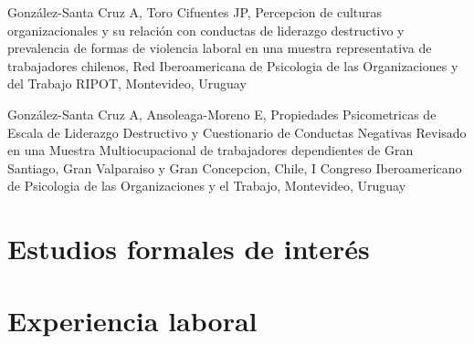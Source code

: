 \documentclass[11pt,a4paper,]{awesome-cv}
\begin{document}
\begin{cventries}
{\begin{cvitems}
\item González-Santa Cruz A, Toro Cifuentes JP, Percepcion de culturas organizacionales y su relación con conductas de liderazgo destructivo y prevalencia de formas de violencia laboral en una muestra representativa de trabajadores chilenos, Red Iberoamericana de Psicologia de las Organizaciones y del Trabajo RIPOT, Montevideo, Uruguay
\item González-Santa Cruz A, Ansoleaga-Moreno E, Propiedades Psicometricas de Escala de Liderazgo Destructivo y Cuestionario de Conductas Negativas Revisado en una Muestra Multiocupacional de trabajadores dependientes de Gran Santiago, Gran Valparaiso y Gran Concepcion, Chile, I Congreso Iberoamericano de Psicologia de las Organizaciones y el Trabajo, Montevideo, Uruguay
\end{cvitems}}
\end{cventries}

\hypertarget{estudios-formales-de-interuxe9s}{%
\section{Estudios formales de
interés}\label{estudios-formales-de-interuxe9s}}

\fontsize{9.5pt}{1.2em}\color{text}
\begin{cventries}
    \vspace{-4.0mm}
    \vspace{-4.0mm}
    \vspace{-4.0mm}
    \vspace{-4.0mm}
    \vspace{-4.0mm}
\end{cventries}

\pagebreak

\linebreak

\hypertarget{experiencia-laboral-1}{%
\section{Experiencia laboral}\label{experiencia-laboral-1}}
\end{document}
